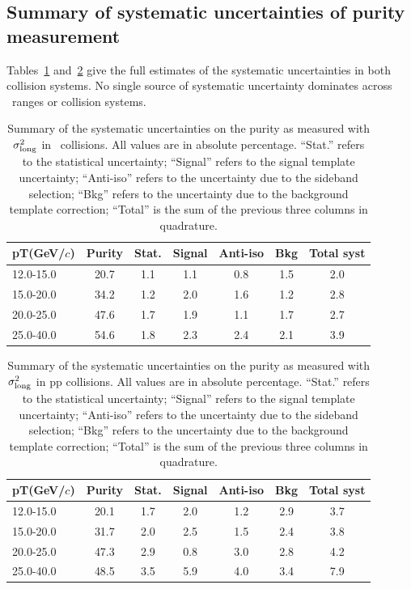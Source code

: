 \FloatBarrier
\subsection{Summary of systematic uncertainties of purity measurement}

Tables~\ref{tab:pursystppblambda} and~\ref{tab:pursystpplambda} give the full estimates of the systematic uncertainties in both collision systems. No single source of systematic uncertainty dominates across \pt~ranges or collision systems.


\begin{table}[h]
    \centering
        \caption{Summary of the systematic uncertainties on the purity as measured with $\sigma^{2}_{\mathrm{long}}$ in \pPb~collisions. All values are in absolute percentage. ``Stat.'' refers to the statistical uncertainty; ``Signal'' refers to the signal template uncertainty; ``Anti-iso'' refers to the uncertainty due to the sideband selection; ``Bkg'' refers to the uncertainty due to the background template correction; ``Total'' is the sum of the previous three columns in quadrature.}
    \begin{tabular*}{1.0\columnwidth}{@{\extracolsep{\fill}}lcccccc@{}}
    \hline
    	pT(GeV/$c$) & Purity & Stat. & Signal & Anti-iso & Bkg & Total syst \\ \hline
    	12.0-15.0 & 20.7 & 1.1 & 1.1 & 0.8 & 1.5 & 2.0 \\
    	15.0-20.0 & 34.2 & 1.2 & 2.0 & 1.6 & 1.2 & 2.8 \\
    	20.0-25.0 & 47.6 & 1.7 & 1.9 & 1.1 & 1.7 & 2.7 \\
    	25.0-40.0 & 54.6 & 1.8 & 2.3 & 2.4 & 2.1 & 3.9 \\
    \end{tabular*}
    \label{tab:pursystppblambda}
\end{table}


\begin{table}[h]
    \centering
        \caption{Summary of the systematic uncertainties on the purity as measured with $\sigma^{2}_{\mathrm{long}}$ in pp collisions. All values are in absolute percentage. ``Stat.'' refers to the statistical uncertainty; ``Signal'' refers to the signal template uncertainty; ``Anti-iso'' refers to the uncertainty due to the sideband selection; ``Bkg'' refers to the uncertainty due to the background template correction; ``Total'' is the sum of the previous three columns in quadrature.}
    \begin{tabular*}{1.0\columnwidth}{@{\extracolsep{\fill}}lcccccc@{}}
    \hline
    	pT(GeV/$c$) & Purity & Stat. & Signal & Anti-iso & Bkg & Total syst \\ \hline
    	12.0-15.0 & 20.1 & 1.7 & 2.0 & 1.2 & 2.9 & 3.7 \\
    	15.0-20.0 & 31.7 & 2.0 & 2.5 & 1.5 & 2.4 & 3.8 \\
    	20.0-25.0 & 47.3 & 2.9 & 0.8 & 3.0 & 2.8 & 4.2 \\
    	25.0-40.0 & 48.5 & 3.5 & 5.9 & 4.0 & 3.4 & 7.9 \\
    \end{tabular*}
    \label{tab:pursystpplambda}
\end{table}


